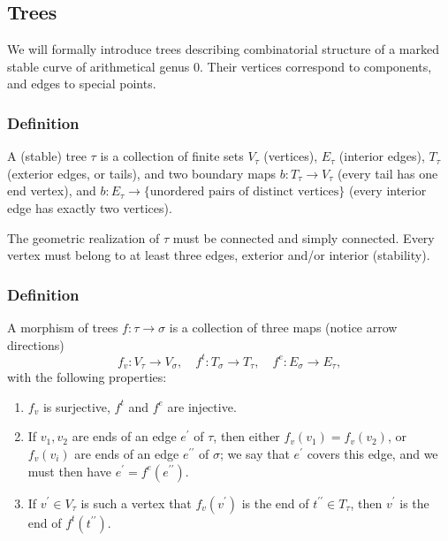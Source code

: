\documentclass[reqno]{amsart}
\theoremstyle{definition}
\begin{document}
\medskip

\subsection{Trees}
We will formally introduce trees describing combinatorial
structure of a marked stable curve of arithmetical genus $0$.
Their vertices correspond to components, and edges to special points.

\smallskip

\subsubsection{Definition}
  A (stable) tree $\tau$ is a
  collection of finite sets $V_\tau$ (vertices),
  $E_\tau$ (interior edges),
  $T_\tau$ (exterior edges, or tails),
  and two boundary maps $b \colon T_\tau \to V_\tau$ (every tail has
  one end vertex),
  and $b \colon E_\tau \to \{\text{unordered pairs of distinct vertices}\}$
  (every interior edge has exactly two vertices).

  \smallskip

  The geometric realization of $\tau$ must be connected and
  simply connected. Every vertex must belong to at least three
  edges, exterior and/or interior (stability).


\medskip

\subsubsection{Definition}
  A morphism of trees $f \colon \tau \to \sigma$
  is a collection of three maps (notice arrow directions)
  \[
    f_v\colon V_\tau \to V_\sigma , \quad
    f^t\colon T_\sigma \to T_\tau , \quad
    f^e\colon E_\sigma \to E_\tau ,
  \]
  with the following properties:
  \begin{enumerate}
    \item[(a)] $f_v$ is surjective, $f^t$ and $f^e$ are injective.
    \item[(b)] If $v_1,v_2$ are ends of an edge $e^{\prime}$ of $\tau$, then
      either $f_v(v_1)=f_v(v_2)$, or $f_v(v_i)$ are ends of an edge
      $e^{\prime\prime}$ of $\sigma$; we say that $e^{\prime}$
      covers this edge, and we must then have
      $e^{\prime}=f^e(e^{\prime\prime})$.
    \item[(c)] If $v^{\prime}\in V_\tau$ is such a vertex that
      $f_v(v^{\prime})$ is the end of $t^{\prime\prime}\in T_{\tau}$, then
      $v^{\prime}$ is the end of $f^t(t^{\prime\prime})$.
  \end{enumerate}
\end{document}
